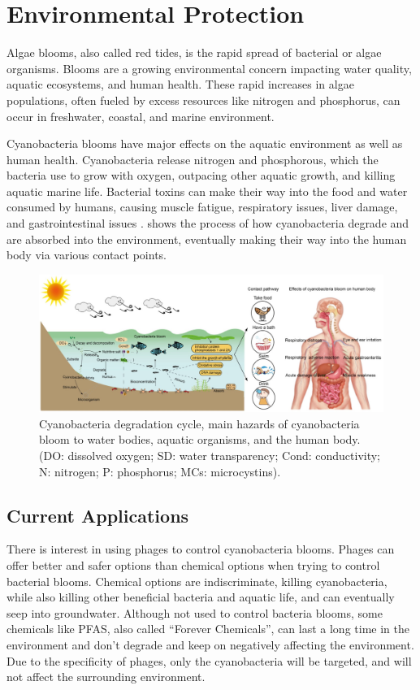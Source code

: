\section{Environmental Protection}
\label{sec:AppendixB:environmental_protection}
Algae blooms, also called red tides, is the rapid spread of bacterial or algae organisms.
Blooms are a growing environmental concern impacting water quality, aquatic ecosystems, and human health.
These rapid increases in algae populations, often fueled by excess resources like nitrogen and phosphorus, can occur in freshwater, coastal, and marine environment. 

Cyanobacteria blooms have major effects on the aquatic environment as well as human health.
Cyanobacteria release nitrogen and phosphorous, which the bacteria use to grow with oxygen, outpacing other aquatic growth, and killing aquatic marine life.
Bacterial toxins can make their way into the food and water consumed by humans, causing muscle fatigue, respiratory issues, liver damage, and gastrointestinal issues \cite{zhangImpactCyanobacteriaBlooms2022}.
 shows the process of how cyanobacteria degrade and are absorbed into the environment, eventually making their way into the human body via various contact points.
 
\begin{figure}
    \centering
    \includegraphics[width=0.75\linewidth]{Figures/cyanobacteria_bloom_cycle.png} 
    \caption{Cyanobacteria degradation cycle, main hazards of cyanobacteria bloom to water bodies, aquatic organisms, and the human body. (DO: dissolved oxygen; SD: water transparency; Cond: conductivity; N: nitrogen; P: phosphorus; MCs: microcystins). \cite{zhangImpactCyanobacteriaBlooms2022}}
    \label{fig:cyanobacteria_bloom_cycle}
\end{figure}

\subsection{Current Applications}
    There is interest in using phages to control cyanobacteria blooms.
Phages can offer better and safer options than chemical options when trying to control bacterial blooms.
Chemical options are indiscriminate, killing cyanobacteria, while also killing other beneficial bacteria and aquatic life, and can eventually seep into groundwater.
Although not used to control bacteria blooms, some chemicals like PFAS, also called “Forever Chemicals”, can last a long time in the environment and don't degrade and keep on negatively affecting the environment.
Due to the specificity of phages, only the cyanobacteria will be targeted, and will not affect the surrounding environment. 

